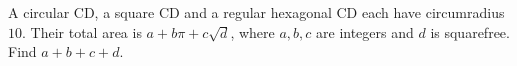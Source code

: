 A circular CD, a square CD and a regular hexagonal CD each have circumradius $10$. Their total area is $a+b\pi+c\sqrt d$, where $a,b,c$ are integers and $d$ is squarefree. Find $a+b+c+d$.
